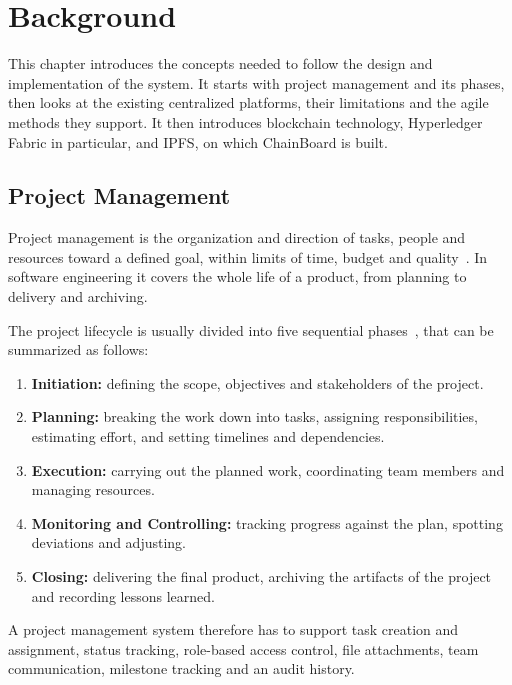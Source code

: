 \chapter{Background}
\label{ch:background}

This chapter introduces the concepts needed to follow the design and implementation of the system. It starts with project management and its phases, then looks at the existing centralized platforms, their limitations and the agile methods they support. It then introduces blockchain technology, Hyperledger Fabric in particular, and IPFS, on which ChainBoard is built.

\section{Project Management}
\label{sec:pm}

Project management is the organization and direction of tasks, people and resources toward a defined goal, within limits of time, budget and quality~\cite{pmbok}. In software engineering it covers the whole life of a product, from planning to delivery and archiving.

The project lifecycle is usually divided into five sequential phases~\cite{pmbok}, that can be summarized as follows:

\begin{enumerate}
    \item \textbf{Initiation:} defining the scope, objectives and stakeholders of the project.
    \item \textbf{Planning:} breaking the work down into tasks, assigning responsibilities, estimating effort, and setting timelines and dependencies.
    \item \textbf{Execution:} carrying out the planned work, coordinating team members and managing resources.
    \item \textbf{Monitoring and Controlling:} tracking progress against the plan, spotting deviations and adjusting.
    \item \textbf{Closing:} delivering the final product, archiving the artifacts of the project and recording lessons learned.
\end{enumerate}

A project management system therefore has to support task creation and assignment, status tracking, role-based access control, file attachments, team communication, milestone tracking and an audit history.

